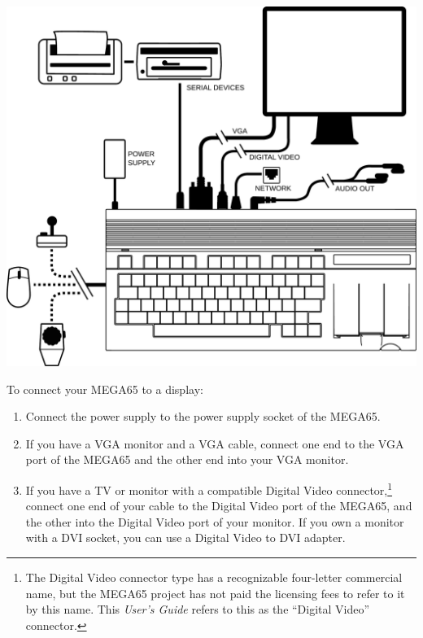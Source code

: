 \includegraphics[width=\linewidth]{images/illustrations/mega65-top.pdf}

To connect your MEGA65 to a display:

\begin{enumerate}
	\item Connect the power supply to the power supply socket of the MEGA65.
	\item If you have a VGA monitor and a VGA cable, connect one end to the VGA port of the MEGA65 and the other end into your VGA monitor.
	\item If you have a TV or monitor with a compatible Digital Video connector,\footnote{The Digital Video connector type has a recognizable four-letter commercial name, but the MEGA65 project has not paid the licensing fees to refer to it by this name. This {\em User's Guide} refers to this as the ``Digital Video'' connector.} connect one end of your cable to the Digital Video port of the MEGA65, and the other into the Digital Video port of your monitor. If you own a monitor with a DVI socket, you can use a Digital Video to DVI adapter.
\end{enumerate}

\newpage
